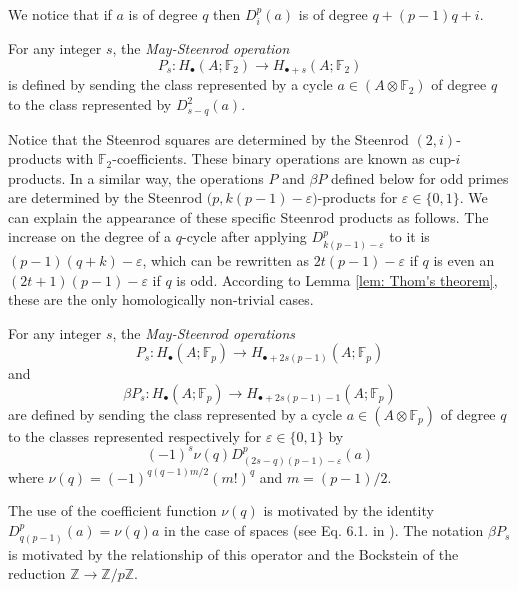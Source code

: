 We notice that if $a$ is of degree $q$ then $D^p_i(a)$ is of degree $q + (p-1)q + i$.

\begin{definition}
	For any integer $s$, the \textit{May-Steenrod operation}
	\begin{equation*}
	P_s : H_\bullet(A; \mathbb{F}_2) \to H_{\bullet + s}(A; \mathbb{F}_2)
	\end{equation*}
	is defined by sending the class represented by a cycle $a \in (A \otimes \mathbb{F}_2)$ of degree $q$ to the class represented by $D^2_{s-q}(a)$.
\end{definition}

Notice that the Steenrod squares are determined by the Steenrod $(2,i)$-products with $\mathbb{F}_2$-coefficients. These binary operations are known as cup-$i$ products. In a similar way, the operations $P$ and $\beta P$ defined below for odd primes are determined by the Steenrod $\big(p, k(p-1)-\varepsilon\big)$-products for $\varepsilon \in \{0,1\}$. We can explain the appearance of these specific Steenrod products as follows. The increase on the degree of a $q$-cycle after applying $D^p_{k(p-1)-\varepsilon}$ to it is $(p-1)(q+k) - \varepsilon$, which can be rewritten as $2t(p-1) - \varepsilon$ if $q$ is even an $(2t+1)(p-1) - \varepsilon$ if $q$ is odd. According to Lemma \ref{lem: Thom's theorem}, these are the only homologically non-trivial cases.

\begin{definition} \label{def: Steenrod operations at odd prime}
	For any integer $s$, the \textit{May-Steenrod operations}
	\begin{equation*}
	P_s : H_\bullet(A; \mathbb{F}_p) \to H_{\bullet + 2s(p-1)}(A; \mathbb{F}_p)
	\end{equation*}
	and
	\begin{equation*}
	\beta P_s : H_\bullet(A; \mathbb{F}_p) \to H_{\bullet + 2s(p-1) - 1}(A; \mathbb{F}_p)
	\end{equation*}
	are defined by sending the class represented by a cycle $a \in (A \otimes \mathbb{F}_p)$ of degree $q$ to the classes represented respectively for $\varepsilon \in\{0,1\}$ by
	\begin{equation*}
	(-1)^s \nu(q) D^p_{(2s-q)(p-1)-\varepsilon}(a)
	\end{equation*}
	where $\nu(q) = (-1)^{q(q-1)m/2}(m!)^q$ and $m = (p-1)/2$.
\end{definition}

\begin{remark}
	The use of the coefficient function $\nu(q)$ is motivated by the identity $D_{q(p-1)}^p(a) = \nu(q)a$ in the case of spaces (see Eq. 6.1. in \cite{steenrod53cyclic}). The notation $\beta P_s$ is motivated by the relationship of this operator and the Bockstein of the reduction $\mathbb Z \to \mathbb Z/p\mathbb Z$.
\end{remark}

